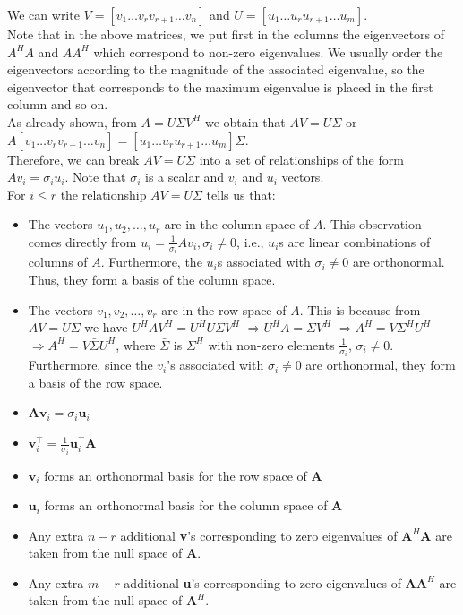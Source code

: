 We can write \( V = [v_1 \ldots v_r v_{r+1} \ldots v_n] \) and \( U = [u_1 \ldots u_r u_{r+1} \ldots u_m] \).\\

Note that in the above matrices, we put first in the columns the eigenvectors of \( A^H A \) and \( AA^H \) which correspond to non-zero eigenvalues. We usually order the eigenvectors according to the magnitude of the associated eigenvalue, so the eigenvector that corresponds to the maximum eigenvalue is placed in the first column and so on.\\


As already shown, from \( A = U\Sigma V^H \) we obtain that \( AV = U\Sigma \) or \( A[v_1 \ldots v_r v_{r+1} \ldots v_n] = [u_1 \ldots u_r u_{r+1} \ldots u_m]\Sigma \).\\

Therefore, we can break \( AV = U\Sigma \) into a set of relationships of the form \( Av_i = \sigma_i u_i \). Note that \( \sigma_i \) is a scalar and \( v_i \) and \( u_i \) vectors.\\

For \( i \leq r \) the relationship \( AV = U\Sigma \) tells us that:
\begin{itemize}
    \item The vectors \( u_1, u_2, \ldots, u_r \) are in the column space of \( A \). This observation comes directly from \( u_i = \frac{1}{\sigma_i} Av_i, \sigma_i \neq 0 \), i.e., \( u_i \)s are linear combinations of columns of \( A \). Furthermore, the \( u_i \)s associated with \( \sigma_i \neq 0 \) are orthonormal. Thus, they form a basis of the column space.
    \item The vectors \( v_1, v_2, \ldots, v_r \) are in the row space of \( A \). This is because from \( AV = U\Sigma \) we have \( U^H AV^H = U^H U\Sigma V^H \) \( \Rightarrow U^H A = \Sigma V^H \) \( \Rightarrow A^H = V\Sigma^H U^H \) \( \Rightarrow A^H = V\bar{\Sigma} U^H \), where \( \bar{\Sigma} \) is \( \Sigma^H \) with non-zero elements \( \frac{1}{\sigma_i} \), \( \sigma_i \neq 0 \). Furthermore, since the \( v_i \)'s associated with \( \sigma_i \neq 0 \) are orthonormal, they form a basis of the row space.

\end{itemize}

\begin{itemize}
    \item $\textbf{Av}_i = \sigma_i \textbf{u}_i$ 
    \item $\textbf{v}^\top_i = \frac{1}{\sigma_i}\textbf{u}^\top_i\textbf{A} $
    \item $\textbf{v}_i$ forms an orthonormal basis for the row space of \textbf{A}
    \item $\textbf{u}_i$ forms an orthonormal basis for the column space of \textbf{A}
    \item Any extra $n - r$ additional \textbf{v}'s corresponding to zero eigenvalues of $\textbf{A}^H\textbf{A}$ are taken from the null space of \textbf{A}.
    \item Any extra $m - r$ additional \textbf{u}'s corresponding to zero eigenvalues of $\textbf{A}\textbf{A}^H$ are taken from the null space of $\textbf{A}^H$.
\end{itemize}

